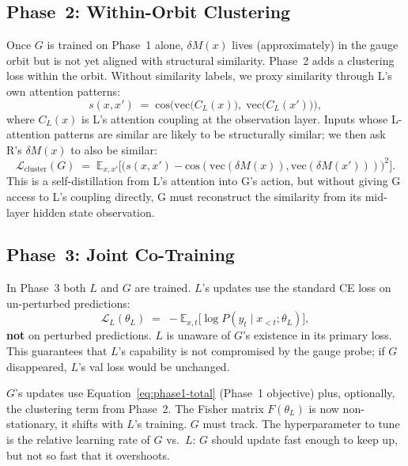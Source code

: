 \documentclass[11pt, a4paper]{article}
\theoremstyle{plain}
\theoremstyle{definition}
\theoremstyle{remark}
\begin{document}
\subsection{Phase~2: Within-Orbit Clustering}

Once $G$ is trained on Phase~1 alone, $\delta M(x)$ lives (approximately) in the gauge orbit but is not yet aligned with structural similarity.
Phase~2 adds a clustering loss within the orbit.
Without similarity labels, we proxy similarity through L's own attention patterns:
\begin{equation}
s(x, x') \;=\; \mathrm{cos}\!\Big( \mathrm{vec}\!\big(C_{L}(x)\big),\; \mathrm{vec}\!\big(C_{L}(x')\big) \Big),
\end{equation}
where $C_{L}(x)$ is L's attention coupling at the observation layer.
Inputs whose L-attention patterns are similar are likely to be structurally similar; we then ask R's $\delta M(x)$ to also be similar:
\begin{equation}
\mathcal{L}_{\text{cluster}}(G) \;=\; \mathbb{E}_{x, x'}\Big[ \big( s(x, x') - \mathrm{cos}(\mathrm{vec}(\delta M(x)), \mathrm{vec}(\delta M(x'))) \big)^{2} \Big].
\end{equation}
This is a self-distillation from L's attention into G's action, but without giving G access to L's coupling directly, G must reconstruct the similarity from its mid-layer hidden state observation.

\subsection{Phase~3: Joint Co-Training}

In Phase~3 both $L$ and $G$ are trained.
$L$'s updates use the standard CE loss on un-perturbed predictions:
\[
\mathcal{L}_{L}(\theta_{L}) \;=\; -\mathbb{E}_{x, t}\big[ \log P(y_{t} \mid x_{<t}; \theta_{L}) \big],
\]
\textbf{not} on perturbed predictions.
$L$ is unaware of $G$'s existence in its primary loss.
This guarantees that $L$'s capability is not compromised by the gauge probe; if $G$ disappeared, $L$'s val loss would be unchanged.

$G$'s updates use Equation~\ref{eq:phase1-total} (Phase~1 objective) plus, optionally, the clustering term from Phase~2.
The Fisher matrix $F(\theta_{L})$ is now non-stationary, it shifts with $L$'s training.
$G$ must track.
The hyperparameter to tune is the relative learning rate of $G$ vs.\ $L$: $G$ should update fast enough to keep up, but not so fast that it overshoots.
\end{document}
